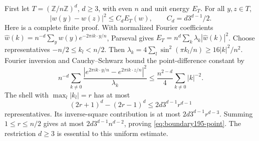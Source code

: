 First let $T=(\mathbb Z/n\mathbb Z)^d$, $d\ge3$, with even $n$ and unit
energy $E_T$. For all $y,z\in T$,
\begin{equation}\label{eq:boundary195-point}
 |w(y)-w(z)|^2\le C_d E_T(w),\qquad C_d=d3^{d-1}/2.
\end{equation}
Here is a complete finite proof. With normalized Fourier coefficients
$\widehat w(k)=n^{-d}\sum_y w(y)e^{-2\pi i k\cdot y/n}$,
Parseval gives $E_T=n^d\sum_k\lambda_k|\widehat w(k)|^2$.
Choose representatives $-n/2\le k_l<n/2$. Then
$\lambda_k=4\sum_l\sin^2(\pi k_l/n)\ge16|k|^2/n^2$.
Fourier inversion and Cauchy--Schwarz bound the point-difference constant by
\[
 n^{-d}\sum_{k\ne0}
 \frac{|e^{2\pi i k\cdot y/n}-e^{2\pi i k\cdot z/n}|^2}{\lambda_k}
 \le\frac{n^{2-d}}4\sum_{k\ne0}|k|^{-2}.
\]
The shell with $\max_l|k_l|=r$ has at most
\[
 (2r+1)^d-(2r-1)^d\le2d3^{d-1}r^{d-1}
\]
representatives. Its inverse-square contribution is at most
$2d3^{d-1}r^{d-3}$. Summing $1\le r\le n/2$ gives at most
$2d3^{d-1}n^{d-2}$, proving \eqref{eq:boundary195-point}.
The restriction $d\ge3$ is essential to this uniform estimate.

